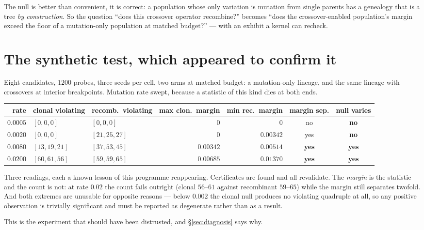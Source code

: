\documentclass[11pt,a4paper]{article}
\theoremstyle{definition}
\theoremstyle{remark}
\begin{document}
The null is better than convenient, it is correct: a population whose only
variation is mutation from single parents has a genealogy that is a tree
\emph{by construction}. So the question ``does this crossover operator
recombine?'' becomes ``does the crossover-enabled population's margin exceed the
floor of a mutation-only population at matched budget?'' --- with an exhibit a
kernel can recheck.

\section{The synthetic test, which appeared to confirm it}

Eight candidates, $1200$ probes, three seeds per cell, two arms at matched
budget: a mutation-only lineage, and the same lineage with crossovers at interior
breakpoints. Mutation rate swept, because a statistic of this kind dies at both
ends.

\begin{center}\scriptsize
\begin{tabular}{@{}rllrrcc@{}}
\toprule
rate & clonal violating & recomb.\ violating & max clon.\ margin & min rec.\ margin & margin sep. & null varies \\
\midrule
$0.0005$ & $[0,0,0]$ & $[0,0,0]$ & $0$ & $0$ & no & \textbf{no} \\
$0.0020$ & $[0,0,0]$ & $[21,25,27]$ & $0$ & $0.00342$ & yes & \textbf{no} \\
$0.0080$ & $[13,19,21]$ & $[37,53,45]$ & $0.00342$ & $0.00514$ & \textbf{yes} & \textbf{yes} \\
$0.0200$ & $[60,61,56]$ & $[59,59,65]$ & $0.00685$ & $0.01370$ & \textbf{yes} & \textbf{yes} \\
\bottomrule
\end{tabular}
\end{center}

Three readings, each a known lesson of this programme reappearing. Certificates
are found and all revalidate. The \emph{margin} is the statistic and the count is
not: at rate $0.02$ the count fails outright (clonal $56$--$61$ against
recombinant $59$--$65$) while the margin still separates twofold. And both
extremes are unusable for opposite reasons --- below $0.002$ the clonal null
produces no violating quadruple at all, so any positive observation is trivially
significant and must be reported as degenerate rather than as a result.

This is the experiment that should have been distrusted, and \S\ref{sec:diagnosis}
says why.
\end{document}
